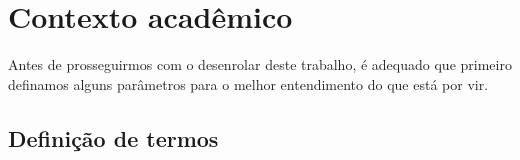 \chapter{Contexto acadêmico} \label{chap:contexto}            %

Antes de prosseguirmos com o desenrolar deste trabalho, é adequado que primeiro definamos alguns parâmetros para o melhor entendimento do que está por vir.




\section{Definição de termos} \label{sec:termos}              %


